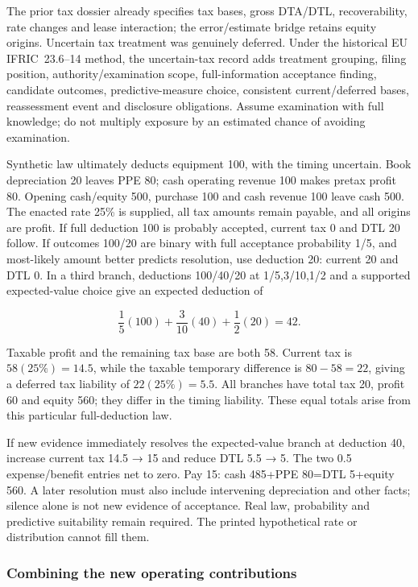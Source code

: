 The prior tax dossier already specifies tax bases, gross DTA/DTL, recoverability, rate changes and lease interaction; the error/estimate bridge retains equity origins. Uncertain tax treatment was genuinely deferred. Under the historical EU IFRIC~23.6--14 \citep[IFRIC~23.6--14,A1--A5]{eu20231803} method, the uncertain-tax record adds treatment grouping, filing position, authority/examination scope, full-information acceptance finding, candidate outcomes, predictive-measure choice, consistent current/deferred bases, reassessment event and disclosure obligations. Assume examination with full knowledge; do not multiply exposure by an estimated chance of avoiding examination.

Synthetic law ultimately deducts equipment 100, with the timing uncertain. Book depreciation 20 leaves PPE 80; cash operating revenue 100 makes pretax profit 80. Opening cash/equity 500, purchase 100 and cash revenue 100 leave cash 500. The enacted rate 25\% is supplied, all tax amounts remain payable, and all origins are profit. If full deduction 100 is probably accepted, current tax 0 and DTL 20 follow. If outcomes 100/20 are binary with full acceptance probability 1/5, and most-likely amount better predicts resolution, use deduction 20: current 20 and DTL 0. In a third branch, deductions 100/40/20 at 1/5,3/10,1/2 and a supported expected-value choice give an expected deduction of

\[\frac15(100)+\frac3{10}(40)+\frac12(20)=42.\]

Taxable profit and the remaining tax base are both 58. Current tax is \(58(25\%)=14.5\), while the taxable temporary difference is \(80-58=22\), giving a deferred tax liability of \(22(25\%)=5.5\). All branches have total tax 20, profit 60 and equity 560; they differ in the timing liability. These equal totals arise from this particular full-deduction law.

If new evidence immediately resolves the expected-value branch at deduction 40, increase current tax 14.5 → 15 and reduce DTL 5.5 → 5. The two 0.5 expense/benefit entries net to zero. Pay 15: cash 485+PPE 80=DTL 5+equity 560. A later resolution must also include intervening depreciation and other facts; silence alone is not new evidence of acceptance. Real law, probability and predictive suitability remain required. The printed hypothetical rate or distribution cannot fill them.

\hypertarget{combining-the-new-operating-contributions}{%
\subsubsection{Combining the new operating contributions}\label{combining-the-new-operating-contributions}}

